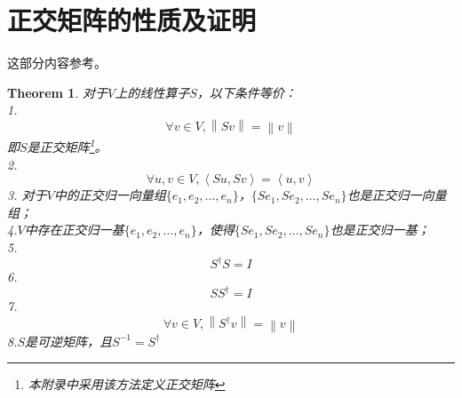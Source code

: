 \documentclass[12pt,a4paper,openany,twoside]{book}
\newtheorem{theorem}{Theorem}[section]
\numberwithin{equation}{section}
\begin{document}
    \newpage
    \appendix
    \appendixname
    \addappheadtotoc
      \renewcommand\thesection{\Alph{section}}
      \section{正交矩阵的性质及证明}
        \label{orthogonal_matrix_properties}
        这部分内容参考\cite{linear_algebra_done_right}。
        \begin{theorem}
          对于$V$上的线性算子$S$，以下条件等价：\\
          1.
            \begin{equation}
              \forall v\in V, \left\|Sv\right\|=\left\|v\right\|
            \end{equation}
            即$S$是正交矩阵\footnote{本附录中采用该方法定义正交矩阵}。\\
          2.
            \begin{equation}
              \forall u,v\in V, \left\langle Su,Sv\right\rangle=\left\langle u,v\right\rangle
            \end{equation}
          3. 对于$V$中的正交归一向量组$\{e_1,e_2,\dots,e_n\}$，$\{Se_1,Se_2,\dots,Se_n\}$也是正交归一向量组；\\
          4.$V$中存在正交归一基$\{e_1,e_2,\dots,e_n\}$，使得$\{Se_1,Se_2,\dots,Se_n\}$也是正交归一基；\\
          5.
            \begin{equation}
              S^\dagger S=I
            \end{equation}
          6.
            \begin{equation}
              SS^\dagger=I
            \end{equation}
          7.
            \begin{equation}
              \forall v\in V, \left\|S^\dagger v\right\|=\left\|v\right\|
            \end{equation}
          8.$S$是可逆矩阵，且$S^{-1}=S^\dagger$
        \end{theorem}
\end{document}
